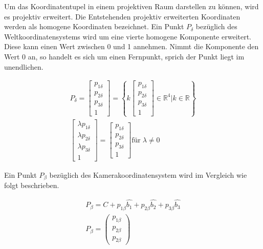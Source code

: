 Um das Koordinatentupel in einem projektiven Raum darstellen zu können, wird es projektiv erweitert. Die Entstehenden projektiv erweiterten Koordinaten werden als homogene Koordinaten bezeichnet. Ein Punkt $P_\delta$ bezüglich des Weltkoordinatensystems wird um eine vierte homogene Komponente erweitert. Diese kann einen Wert zwischen 0 und 1 annehmen. Nimmt die Komponente den Wert 0 an, so handelt es sich um einen Fernpunkt, sprich der Punkt liegt im unendlichen.

\begin{gather}
	P_\delta = \begin{bmatrix} p_{1\delta} \\ p_{2\delta} \\ p_{3\delta} \\1 \end{bmatrix} = \left\{ k \begin{bmatrix} p_{1\delta}\\p_{2\delta}\\p_{3\delta}\\1 \end{bmatrix} \in \mathbb{R} ^4 |  k \in \mathbb{R}\right\}\\
	\begin{bmatrix}\lambda p_{1\delta}\\ \lambda p_{2\delta} \\ \lambda p_{3\delta} \\ 1 \end{bmatrix} = \begin{bmatrix}p_{1\delta} \\ p_{2\delta} \\ p_{3\delta} \\ 1\end{bmatrix} \text{für} \; \lambda \ne 0
\end{gather}

\pagebreak
Ein Punkt $P_\beta$ bezüglich des Kamerakoordinatensystem wird im Vergleich wie folgt beschrieben.

\begin{gather}
	P_\beta = C + p_{1\beta}\hat{b_1} + p_{2\beta}\hat{b_2} +  p_{3\beta}\hat{b_3}\\
	P_\beta = \begin{pmatrix} p_{1\beta} \\  p_{2\beta} \\ p_{2\beta}\end{pmatrix}
\end{gather}\\

